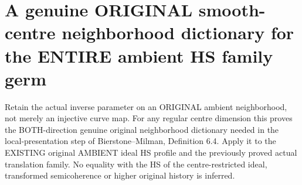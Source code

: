\section{A genuine ORIGINAL smooth-centre neighborhood dictionary for the ENTIRE ambient HS family germ}

Retain the actual inverse parameter on an ORIGINAL ambient neighborhood,
not merely an injective curve map. For any regular centre dimension this
proves the BOTH-direction genuine original neighborhood dictionary needed
in the local-presentation step of Bierstone--Milman\cite{bierstone-milman97-invent-math},
Definition 6.4. Apply it to the EXISTING original AMBIENT ideal HS profile and
the previously proved actual translation family. No equality with the HS of
the centre-restricted ideal, transformed semicoherence or higher original
history is inferred.


